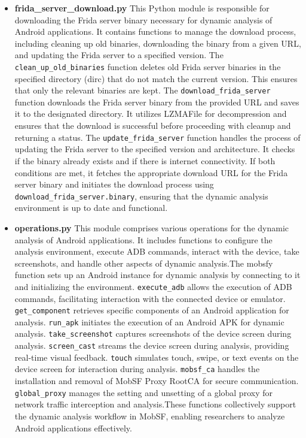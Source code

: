 \documentclass{report}
\begin{document}
\begin{itemize}
\begin{itemize}
        \item \textbf {frida\_server\_download.py}
        This Python module is responsible for downloading the Frida server binary necessary for dynamic analysis of Android applications. It contains functions to manage the download process, including cleaning up old binaries, downloading the binary from a given URL, and updating the Frida server to a specified version. \newline
        The  \texttt{clean\_up\_old\_binaries} function deletes old Frida server binaries in the specified directory (dirc) that do not match the current version. This ensures that only the relevant binaries are kept. \newline     
        The  \texttt{download\_frida\_server} function downloads the Frida server binary from the provided URL and saves it to the designated directory. It utilizes LZMAFile for decompression and ensures that the download is successful before proceeding with cleanup and returning a status. \newline  
        The  \texttt{update\_frida\_server} function handles the process of updating the Frida server to the specified version and architecture. It checks if the binary already exists and if there is internet connectivity. If both conditions are met, it fetches the appropriate download URL for the Frida server binary and initiates the download process using  \texttt{download\_frida\_server.binary}, ensuring that the dynamic analysis environment is up to date and functional.

        \item \textbf {operations.py}
        This module comprises various operations for the dynamic analysis of Android applications. It includes functions to configure the analysis environment, execute ADB commands, interact with the device, take screenshots, and handle other aspects of dynamic analysis.The mobsfy function sets up an Android instance for dynamic analysis by connecting to it and initializing the environment. \texttt{execute\_adb} allows the execution of ADB commands, facilitating interaction with the connected device or emulator.  \texttt{get\_component} retrieves specific components of an Android application for analysis.  \texttt{run\_apk} initiates the execution of an Android APK for dynamic analysis.  \texttt{take\_screenshot} captures screenshots of the device screen during analysis.  \texttt{screen\_cast} streams the device screen during analysis, providing real-time visual feedback.  \texttt{touch} simulates touch, swipe, or text events on the device screen for interaction during analysis.  \texttt{mobsf\_ca} handles the installation and removal of MobSF Proxy RootCA for secure communication.  \texttt{global\_proxy} manages the setting and unsetting of a global proxy for network traffic interception and analysis.These functions collectively support the dynamic analysis workflow in MobSF, enabling researchers to analyze Android applications effectively.


\end{itemize}
\end{itemize}
\end{document}

